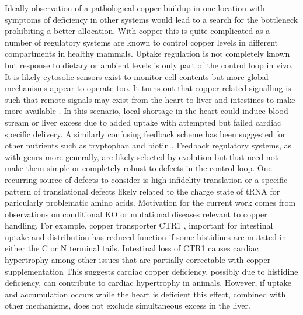 {Ideally observation of a pathological copper 
buildup in one location with symptoms of deficiency
in other systems would lead to a search for 
the bottleneck prohibiting a better allocation.
With copper this is quite complicated as 
a number of regulatory systems are known to control
copper levels in different compartments  in healthy mammals.
Uptake regulation is not completely known but response to
dietary or ambient levels is only part of the control
loop in vivo. It is  likely cytosolic sensors exist \cite{PMC6365104}
to monitor cell contents but more global mechanisms appear to 
operate too.
It turns out that copper related signalling is such that remote 
signals may exist from the heart
to liver and intestines to make more available
\cite{Kim_Turski_Nose_Cardiac_Copper_Deficiency_Activates_2010}
\cite{xxx_Mechanism_regulation_2010}. In this scenario, local
shortage in the heart could induce blood stream or liver excess 
due to added
uptake with attempted but failed   cardiac specific delivery.
A similarly confusing  feedback scheme 
has been suggested for other nutrients such as tryptophan
\cite{mmarchywka-MJM-2021-007-.1-table-rg}
and biotin
\cite{marchywka-MJM-2022-010-0.80}
\cite{marchywka-MJM-2021-015-0.50-rg}
.  Feedback  regulatory systems, as with genes more generally,  are likely 
selected by evolution but that need not make them simple
or  completely robust to defects in the control loop.
One recurring source of defects to consider is  high-infidelity
translation or a specific pattern of translational defects likely related
to the charge state of tRNA for paricularly problematic
amino acids.   
Motivation for the current work comes from observations on
conditional KO or mutational diseases relevant to copper handling. 
For example, copper transporter CTR1 , important for
intestinal uptake  
\cite{Nose_Kim_Thiele_Ctr1_drives_intestinal_copper_2006}
and distribution  
\cite{Lee_Prohaska_Thiele_Essential_role_mammalian_2001}
\cite{PMC9759326}
\cite{PMC34439}
has  reduced function  if some
histidines are mutated in either the C or N terminal tails. 
Intestinal loss of CTR1 causes cardiac hypertrophy
among other issues that are partially correctable with copper supplementation
\cite{Nose_Kim_Thiele_Ctr1_drives_intestinal_copper_2006}
This suggests cardiac copper deficiency, possibly due to histidine 
deficiency,  can contribute to  cardiac hypertrophy 
in animals.  However, if uptake and accumulation occurs
while the heart is deficient this effect,  combined
with other mechanisms,   does not exclude simultaneous excess in the liver.


}
